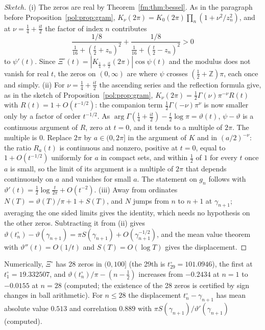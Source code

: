 \begin{proof}[Sketch]
(i) The zeros are real by Theorem~\ref{fm:thm:bessel}. As in the paragraph before Proposition~\ref{pol:prop:gram}, $K_\nu(2\pi)=K_0(2\pi)\prod_n(1+\nu^2/z_n^2)$, and at $\nu=\frac14+\frac{it}2$ the factor of index $n$ contributes
\[
\frac{1/8}{\frac1{16}+(\frac t2+z_n)^2}+\frac{1/8}{\frac1{16}+(\frac t2-z_n)^2}>0
\]
to $\psi'(t)$. Since $\Xi^\circ(t)=|K_{\frac14+\frac{it}2}(2\pi)|\cos\psi(t)$ and the modulus does not vanish for real $t$, the zeros on $(0,\infty)$ are where $\psi$ crosses $(\frac12+\mathbb Z)\pi$, each once and simply.
(ii) For $\nu=\frac14+\frac{it}2$ the ascending series and the reflection formula give, as in the sketch of Proposition~\ref{pol:prop:gram}, $K_\nu(2\pi)=\frac12\Gamma(\nu)\pi^{-\nu}R(t)$ with $R(t)=1+O(t^{-1/2})$: the companion term $\frac12\Gamma(-\nu)\pi^\nu$ is now smaller only by a factor of order $t^{-1/2}$. As $\arg\Gamma(\frac14+\frac{it}2)-\frac t2\log\pi=\vartheta(t)$, $\psi-\vartheta$ is a continuous argument of $R$, zero at $t=0$, and it tends to a multiple of $2\pi$. The multiple is $0$. Replace $2\pi$ by $a\in(0,2\pi]$ in the argument of $K$ and in $(a/2)^{-\nu}$: the ratio $R_a(t)$ is continuous and nonzero, positive at $t=0$, equal to $1+O(t^{-1/2})$ uniformly for $a$ in compact sets, and within $\frac12$ of $1$ for every $t$ once $a$ is small, so the limit of its argument is a multiple of $2\pi$ that depends continuously on $a$ and vanishes for small $a$. The statement on $g_n$ follows with $\vartheta'(t)=\frac12\log\frac t{2\pi}+O(t^{-2})$.
(iii) Away from ordinates $N(T)=\vartheta(T)/\pi+1+S(T)$, and $N$ jumps from $n$ to $n+1$ at $\gamma_{n+1}$; averaging the one sided limits gives the identity, which needs no hypothesis on the other zeros. Subtracting it from (ii) gives $\vartheta(t^\circ_n)-\vartheta(\gamma_{n+1})=\pi S(\gamma_{n+1})+O(\gamma_{n+1}^{-1/2})$, and the mean value theorem with $\vartheta''(t)=O(1/t)$ and $S(T)=O(\log T)$ gives the displacement.
\end{proof}

Numerically, $\Xi^\circ$ has 28 zeros in $(0,100]$ (the 29th is $t^\circ_{29}=101.0946$), the first at $t^\circ_1=19.332507$, and $\vartheta(t^\circ_n)/\pi-(n-\frac12)$ increases from $-0.2434$ at $n=1$ to $-0.0155$ at $n=28$ (computed; the existence of the 28 zeros is certified by sign changes in ball arithmetic). For $n\le28$ the displacement $t^\circ_n-\gamma_{n+1}$ has mean absolute value $0.513$ and correlation $0.889$ with $\pi S(\gamma_{n+1})/\vartheta'(\gamma_{n+1})$ (computed).

